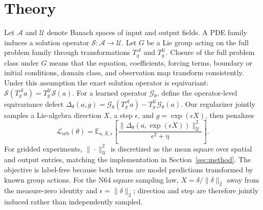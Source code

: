 \section{Theory}
\label{sec:theory}

Let \(\mathcal A\) and \(\mathcal U\) denote Banach spaces of input and output fields. A PDE family induces a solution operator \(\mathcal S:\mathcal A\to\mathcal U\). Let \(G\) be a Lie group acting on the full problem family through transformations \(T_g^{\mathcal A}\) and \(T_g^{\mathcal U}\). Closure of the full problem class under \(G\) means that the equation, coefficients, forcing terms, boundary or initial conditions, domain class, and observation map transform consistently. Under this assumption the exact solution operator is equivariant: \(\mathcal S(T_g^{\mathcal A}a)=T_g^{\mathcal U}\mathcal S(a)\). For a learned operator \(\mathcal G_\theta\), define the operator-level equivariance defect \(\Delta_\theta(a,g)=\mathcal G_\theta(T_g^{\mathcal A}a)-T_g^{\mathcal U}\mathcal G_\theta(a)\). Our regularizer jointly samples a Lie-algebra direction \(X\), a step \(\epsilon\), and \(g=\exp(\epsilon X)\), then penalizes
\begin{equation}
\mathcal L_{\mathrm{orb}}(\theta)=\mathbb E_{a,X,\epsilon}\left[\frac{\|\Delta_\theta(a,\exp(\epsilon X))\|_{\mathcal U}^2}{\epsilon^2+\eta}\right].
\end{equation}
For gridded experiments, \(\|\cdot\|_{\mathcal U}^2\) is discretized as the
mean square over spatial and output entries, matching the implementation in
Section~\ref{sec:method}.
The objective is label-free because both terms are model predictions transformed by known group actions. For the N64 square sampling law, \(X=\delta/\|\delta\|_2\) away from the measure-zero identity and \(\epsilon=\|\delta\|_2\); direction and step are therefore jointly induced rather than independently sampled.


